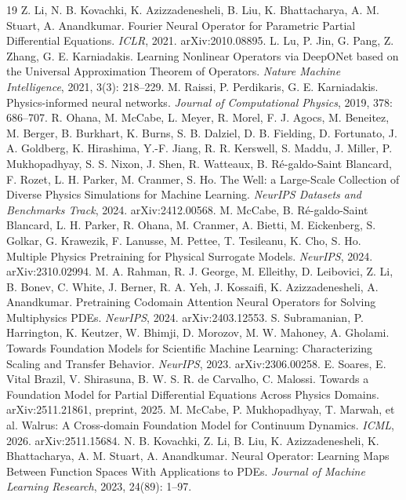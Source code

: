 \documentclass[preprint,12pt]{elsarticle}
\begin{document}
\begin{thebibliography}{19}
 Z. Li, N. B. Kovachki, K. Azizzadenesheli, B. Liu, K. Bhattacharya, A. M. Stuart, A. Anandkumar. Fourier Neural Operator for Parametric Partial Differential Equations. \emph{ICLR}, 2021. arXiv:2010.08895.
 L. Lu, P. Jin, G. Pang, Z. Zhang, G. E. Karniadakis. Learning Nonlinear Operators via DeepONet based on the Universal Approximation Theorem of Operators. \emph{Nature Machine Intelligence}, 2021, 3(3): 218--229.
 M. Raissi, P. Perdikaris, G. E. Karniadakis. Physics-informed neural networks. \emph{Journal of Computational Physics}, 2019, 378: 686--707.
 R. Ohana, M. McCabe, L. Meyer, R. Morel, F. J. Agocs, M. Beneitez, M. Berger, B. Burkhart, K. Burns, S. B. Dalziel, D. B. Fielding, D. Fortunato, J. A. Goldberg, K. Hirashima, Y.-F. Jiang, R. R. Kerswell, S. Maddu, J. Miller, P. Mukhopadhyay, S. S. Nixon, J. Shen, R. Watteaux, B. R\'e-galdo-Saint Blancard, F. Rozet, L. H. Parker, M. Cranmer, S. Ho. The Well: a Large-Scale Collection of Diverse Physics Simulations for Machine Learning. \emph{NeurIPS Datasets and Benchmarks Track}, 2024. arXiv:2412.00568.
 M. McCabe, B. R\'e-galdo-Saint Blancard, L. H. Parker, R. Ohana, M. Cranmer, A. Bietti, M. Eickenberg, S. Golkar, G. Krawezik, F. Lanusse, M. Pettee, T. Tesileanu, K. Cho, S. Ho. Multiple Physics Pretraining for Physical Surrogate Models. \emph{NeurIPS}, 2024. arXiv:2310.02994.
 M. A. Rahman, R. J. George, M. Elleithy, D. Leibovici, Z. Li, B. Bonev, C. White, J. Berner, R. A. Yeh, J. Kossaifi, K. Azizzadenesheli, A. Anandkumar. Pretraining Codomain Attention Neural Operators for Solving Multiphysics PDEs. \emph{NeurIPS}, 2024. arXiv:2403.12553.
 S. Subramanian, P. Harrington, K. Keutzer, W. Bhimji, D. Morozov, M. W. Mahoney, A. Gholami. Towards Foundation Models for Scientific Machine Learning: Characterizing Scaling and Transfer Behavior. \emph{NeurIPS}, 2023. arXiv:2306.00258.
 E. Soares, E. Vital Brazil, V. Shirasuna, B. W. S. R. de Carvalho, C. Malossi. Towards a Foundation Model for Partial Differential Equations Across Physics Domains. arXiv:2511.21861, preprint, 2025.
 M. McCabe, P. Mukhopadhyay, T. Marwah, et al. Walrus: A Cross-domain Foundation Model for Continuum Dynamics. \emph{ICML}, 2026. arXiv:2511.15684.
 N. B. Kovachki, Z. Li, B. Liu, K. Azizzadenesheli, K. Bhattacharya, A. M. Stuart, A. Anandkumar. Neural Operator: Learning Maps Between Function Spaces With Applications to PDEs. \emph{Journal of Machine Learning Research}, 2023, 24(89): 1--97.

\end{thebibliography}
\end{document}
